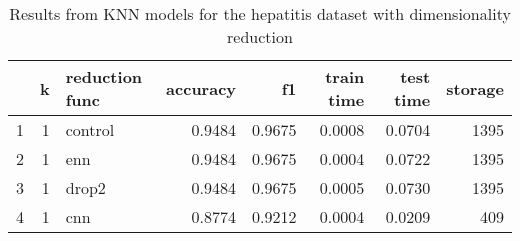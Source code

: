 \begin{table}
\caption{Results from KNN models for the hepatitis dataset with dimensionality reduction}
\label{tab:knn_reduction_results_hepatitis}
\begin{tabular}{rrlrrrrr}
\toprule
 & k & reduction func & accuracy & f1 & train time & test time & storage \\
\midrule
1 & 1 & control & 0.9484 & 0.9675 & 0.0008 & 0.0704 & 1395 \\
2 & 1 & enn & 0.9484 & 0.9675 & 0.0004 & 0.0722 & 1395 \\
3 & 1 & drop2 & 0.9484 & 0.9675 & 0.0005 & 0.0730 & 1395 \\
4 & 1 & cnn & 0.8774 & 0.9212 & 0.0004 & 0.0209 & 409 \\
\bottomrule
\end{tabular}
\end{table}
